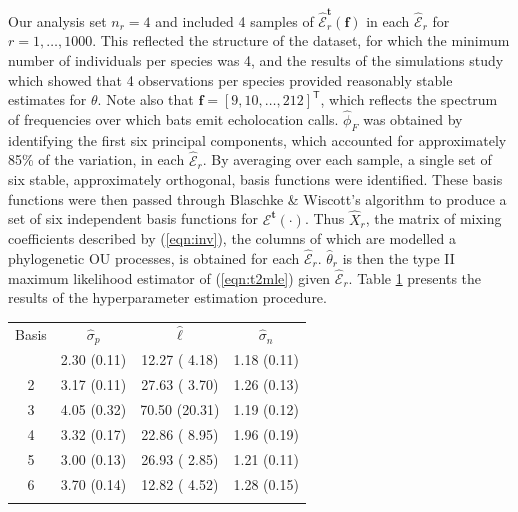 \documentclass{ws-rv9x6}
\begin{document}
Our analysis set \(n_r = 4\) and included 4 samples of \(\hat{\mathcal{E}}_r^{\mathbf{t}}(\mathbf{f})\) in each \(\hat{\mathcal{E}}_r\) for \(r = 1,\dots,1000\). This reflected the structure of the dataset, for which the minimum number of individuals per species was 4, and the results of the simulations study which showed that 4 observations per species provided reasonably stable estimates for \(\theta\). Note also that \(\mathbf{f} = [9,10, \dots, 212]^{\mathsf{T}}\), which reflects the spectrum of frequencies over which bats emit echolocation calls. \(\hat{\phi}_F\) was obtained by identifying the first six principal components, which accounted for approximately 85\% of the variation, in each  \(\hat{\mathcal{E}}_r\). By averaging over each sample, a single set of six stable, approximately orthogonal, basis functions were identified. These basis functions were then passed through Blaschke \& Wiscott's \cite{blaschke2004cubica} algorithm to produce a set of six independent basis functions for \(\mathcal{E}^\mathbf{t}(\cdot)\). Thus \(\hat{X}_r\), the matrix of mixing coefficients described by (\ref{eqn:inv}), the columns of which are modelled a phylogenetic OU processes, is obtained for each \(\hat{\mathcal{E}}_r\). \(\hat{\theta}_r\) is then the type II maximum likelihood estimator of (\ref{eqn:t2mle}) given \(\hat{\mathcal{E}}_r\). Table \ref{tab::bat_results} presents the results of the hyperparameter estimation procedure.

\begin{table}[ht]
	{
		\begin{tabular}{@{}cccc@{}} \toprule
			Basis & \(\hat{\sigma}_p\) & \(\hat{\ell}\) & \(\hat{\sigma}_n\) \\
			\colrule
			1 & 2.30 (0.11) & 12.27 ( 4.18) & 1.18 (0.11) \\
			2 & 3.17 (0.11) & 27.63 ( 3.70) & 1.26 (0.13) \\
			3 & 4.05 (0.32) & 70.50 (20.31) & 1.19 (0.12) \\
			4 & 3.32 (0.17) & 22.86 ( 8.95) & 1.96 (0.19) \\
			5 & 3.00 (0.13) & 26.93 ( 2.85) & 1.21 (0.11) \\
			6 & 3.70 (0.14) & 12.82 ( 4.52) & 1.28 (0.15) \\
			\botrule
		\end{tabular}
	}
	\label{tab::bat_results}
\end{table}
\end{document}
